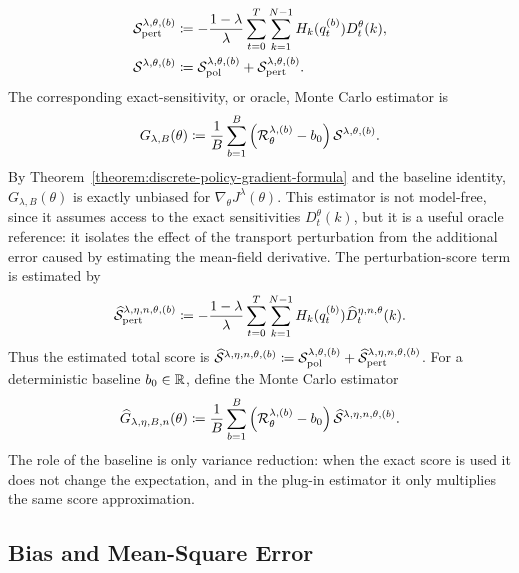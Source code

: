 \begin{align}
    {\cal S}_\mathrm{pert}^{\lambda,\theta,(b)}
    &\coloneqq
    -\frac{1-\lambda}{\lambda}
    \sum_{t=0}^T\sum_{k=1}^{N-1}
    H_k(q_t^{(b)})D_t^\theta(k),\\
    {\cal S}^{\lambda,\theta,(b)}
    &\coloneqq
    {\cal S}_\mathrm{pol}^{\lambda,\theta,(b)}
    +
    {\cal S}_\mathrm{pert}^{\lambda,\theta,(b)}.
\end{align}
The corresponding exact-sensitivity, or oracle, Monte Carlo estimator is
\begin{align}
    G_{\lambda,B}(\theta)
    \coloneqq
    \frac1B
    \sum_{b=1}^B
    \left({\cal R}_\theta^{\lambda,(b)}-b_0\right)
    {\cal S}^{\lambda,\theta,(b)}.
\end{align}
By Theorem~\ref{theorem:discrete-policy-gradient-formula} and the baseline identity, $G_{\lambda,B}(\theta)$ is exactly unbiased for $\nabla_\theta J^\lambda(\theta)$. This estimator is not model-free, since it assumes access to the exact sensitivities $D_t^\theta(k)$, but it is a useful oracle reference: it isolates the effect of the transport perturbation from the additional error caused by estimating the mean-field derivative.
The perturbation-score term is estimated by
\begin{align}
    \widehat {{\cal S}}_\mathrm{pert}^{\lambda,\eta,n,\theta,(b)} \coloneqq -\frac{1-\lambda}{\lambda} \sum_{t=0}^T \sum_{k=1}^{N-1} H_k(q_t^{(b)}) \widehat D_t^{\eta,n,\theta}(k).
\end{align}
Thus the estimated total score is $\widehat {{\cal S}}^{\lambda,\eta,n,\theta,(b)} \coloneqq {\cal S}_\mathrm{pol}^{\lambda,\theta,(b)} + \widehat {{\cal S}}_\mathrm{pert}^{\lambda, \eta,n,\theta,(b)}$. For a deterministic baseline $b_0\in\mathbb{R}$, define the Monte Carlo estimator
\begin{align}
    \widehat G_{\lambda,\eta,B,n}(\theta) \coloneqq \frac1B\sum_{b=1}^B\left({\cal R}_\theta^{\lambda,(b)}-b_0\right)\widehat {{\cal S}}^{\lambda,\eta,n,\theta,(b)}.
\end{align}
The role of the baseline is only variance reduction: when the exact score is used it does not change the expectation, and in the plug-in estimator it only multiplies the same score approximation.

\subsection{Bias and Mean-Square Error}


